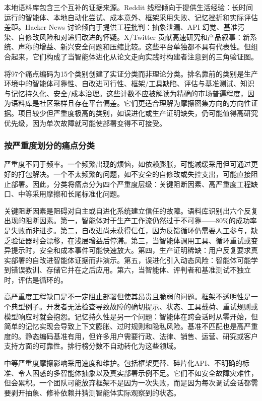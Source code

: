 本地语料库包含三个互补的证据来源。Reddit 线程倾向于提供生活经验：长时间运行的智能体、本地自动化尝试、成本意外、框架采用失败、记忆挫折和实际评估差距。Hacker News 讨论倾向于提供工程批判：抽象泄漏、API 幻觉、基准污染、自修改风险和对递归改进的怀疑。X/Twitter 贡献高速研究和产品叙事：新系统、声称的增益、新兴安全问题和压缩比较。这些平台单独都不具有代表性。但组合起来，它们构成了当智能体进化从论文走向实践时构建者注意到的三角验证图。

将97个痛点编码为15个类别创建了实证分类而非理论分类。排名靠前的类别是生产环境中的智能体可靠性、自改进可行性、框架/工具缺陷、评估与基准测试、知识与记忆持久化、安全/成本治理。这些计数不应被解读为精确的市场普遍程度，因为语料库是社区采样且存在平台偏差。它们更适合理解为摩擦密集方向的方向性证据。项目较少但严重度极高的类别，如误进化或生产证明缺失，仍可能值得高研究优先级，因为单次故障就可能使部署变得不可接受。

\subsubsection{按严重度划分的痛点分类}
\label{sec:ch7-taxonomy-english}

严重度不同于频率。一个频繁出现的烦恼，如依赖膨胀，可能减缓采用但可通过更好的打包解决。一个不太频繁的问题，如不安全的自修改或失控支出，可能直接阻止部署。因此，分类将痛点分为四个严重度层级：关键阻断因素、高严重度工程缺口、中等采用摩擦和长尾标准化问题。

关键阻断因素是阻碍对自主或自进化系统建立信任的故障。语料库识别出六个反复出现的阻断因素。第一，智能体对于生产工作流仍然过于不可靠——80\%的成功率是失败而非进步。第二，自改进尚未获得信任，因为反馈循环仍需要人工参与，缺乏验证器时会漂移，在浅层增益后停滞。第三，当智能体调用工具、循环重试或变异提示时，安全和成本事件可能快速放大。第四，生产证明稀缺：用户反复要求真实部署的自改进智能体证据而非演示。第五，误进化引入动态风险：智能体可能学到错误教训、存储它并在之后应用。第六，当智能体、评判者和基准测试不独立时，评估是循环的。

高严重度工程缺口是不一定阻止部署但使其昂贵且脆弱的问题。框架不透明性是一个典型例子。开发者无法检查导致故障的确切提示、状态、工具载荷、重试规则或模型响应时就会抱怨。记忆持久性是另一个问题：智能体在跨会话时从零开始，但简单的记忆实现会导致上下文膨胀、过时规则和隐私风险。基准不匹配也是高严重度的。静态编码基准有用，但许多用户需要行政、法律、销售、运营、研究或客户支持方面的可靠性。排行榜分数不自动转化为这些领域。

中等严重度摩擦影响采用速度和维护。包括框架更替、碎片化API、不明确的标准、令人困惑的多智能体抽象以及真实部署示例不足。它们不如安全故障灾难性，但会累积。一个团队可能放弃框架不是因为一次失败，而是因为每次调试会话都需要剥开抽象、修补依赖并猜测智能体实际观察到的状态。


